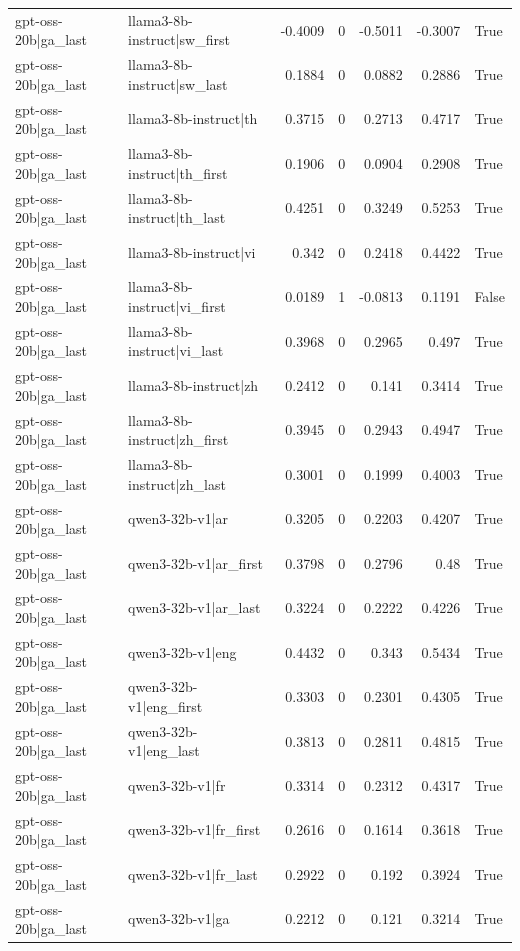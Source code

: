 \begin{table}
\begin{tabular}{l l r r r r l}
gpt-oss-20b|ga_last & llama3-8b-instruct|sw_first & -0.4009 & 0 & -0.5011 & -0.3007 & True \\
gpt-oss-20b|ga_last & llama3-8b-instruct|sw_last & 0.1884 & 0 & 0.0882 & 0.2886 & True \\
gpt-oss-20b|ga_last & llama3-8b-instruct|th & 0.3715 & 0 & 0.2713 & 0.4717 & True \\
gpt-oss-20b|ga_last & llama3-8b-instruct|th_first & 0.1906 & 0 & 0.0904 & 0.2908 & True \\
gpt-oss-20b|ga_last & llama3-8b-instruct|th_last & 0.4251 & 0 & 0.3249 & 0.5253 & True \\
gpt-oss-20b|ga_last & llama3-8b-instruct|vi & 0.342 & 0 & 0.2418 & 0.4422 & True \\
gpt-oss-20b|ga_last & llama3-8b-instruct|vi_first & 0.0189 & 1 & -0.0813 & 0.1191 & False \\
gpt-oss-20b|ga_last & llama3-8b-instruct|vi_last & 0.3968 & 0 & 0.2965 & 0.497 & True \\
gpt-oss-20b|ga_last & llama3-8b-instruct|zh & 0.2412 & 0 & 0.141 & 0.3414 & True \\
gpt-oss-20b|ga_last & llama3-8b-instruct|zh_first & 0.3945 & 0 & 0.2943 & 0.4947 & True \\
gpt-oss-20b|ga_last & llama3-8b-instruct|zh_last & 0.3001 & 0 & 0.1999 & 0.4003 & True \\
gpt-oss-20b|ga_last & qwen3-32b-v1|ar & 0.3205 & 0 & 0.2203 & 0.4207 & True \\
gpt-oss-20b|ga_last & qwen3-32b-v1|ar_first & 0.3798 & 0 & 0.2796 & 0.48 & True \\
gpt-oss-20b|ga_last & qwen3-32b-v1|ar_last & 0.3224 & 0 & 0.2222 & 0.4226 & True \\
gpt-oss-20b|ga_last & qwen3-32b-v1|eng & 0.4432 & 0 & 0.343 & 0.5434 & True \\
gpt-oss-20b|ga_last & qwen3-32b-v1|eng_first & 0.3303 & 0 & 0.2301 & 0.4305 & True \\
gpt-oss-20b|ga_last & qwen3-32b-v1|eng_last & 0.3813 & 0 & 0.2811 & 0.4815 & True \\
gpt-oss-20b|ga_last & qwen3-32b-v1|fr & 0.3314 & 0 & 0.2312 & 0.4317 & True \\
gpt-oss-20b|ga_last & qwen3-32b-v1|fr_first & 0.2616 & 0 & 0.1614 & 0.3618 & True \\
gpt-oss-20b|ga_last & qwen3-32b-v1|fr_last & 0.2922 & 0 & 0.192 & 0.3924 & True \\
gpt-oss-20b|ga_last & qwen3-32b-v1|ga & 0.2212 & 0 & 0.121 & 0.3214 & True \\

\end{tabular}
\end{table}
